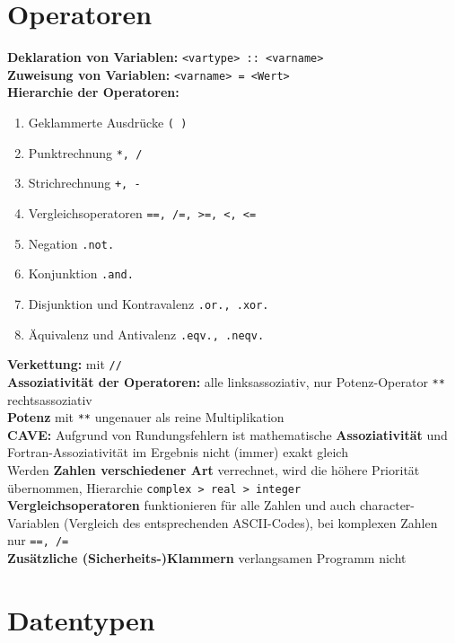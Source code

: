 \documentclass[a4paper, twocolumn]{scrarticle}
\begin{document}
  \section{Operatoren}
  \textbf{Deklaration von Variablen:} \lstinline|<vartype> :: <varname>|\\
  \textbf{Zuweisung von Variablen:} \lstinline|<varname> = <Wert>|\\
  \textbf{Hierarchie der Operatoren:}
  \begin{enumerate}
    \item Geklammerte Ausdrücke \lstinline|( )|
    \item Punktrechnung \lstinline|*, /|
    \item Strichrechnung \lstinline|+, -|
    \item Vergleichsoperatoren \lstinline|==, /=, >=, <, <=|
    \item Negation \lstinline|.not.|
    \item Konjunktion \lstinline|.and.|
    \item Disjunktion und Kontravalenz \lstinline|.or., .xor.|
    \item Äquivalenz und Antivalenz \lstinline|.eqv., .neqv.|
  \end{enumerate}
  \textbf{Verkettung:} mit \lstinline|//|\\
  \textbf{Assoziativität der Operatoren:} alle linksassoziativ, nur Potenz-Operator \lstinline|**| rechtsassoziativ\\
  \textbf{Potenz} mit \lstinline|**| ungenauer als reine Multiplikation\\
  \textbf{CAVE:} Aufgrund von Rundungsfehlern ist mathematische \textbf{Assoziativität} und Fortran-Assoziativität im Ergebnis nicht (immer) exakt gleich \\
  Werden \textbf{Zahlen verschiedener Art} verrechnet, wird die höhere Priorität übernommen, Hierarchie \lstinline|complex > real > integer|\\
  \textbf{Vergleichsoperatoren} funktionieren für alle Zahlen und auch character-Variablen (Vergleich des entsprechenden ASCII-Codes), bei komplexen Zahlen nur \lstinline|==, /=|\\
  \textbf{Zusätzliche (Sicherheits-)Klammern} verlangsamen Programm nicht
  
  \section{Datentypen}
\end{document}
